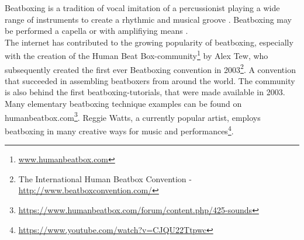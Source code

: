 Beatboxing is a tradition of vocal imitation of a percussionist playing a wide range of instruments to create a rhythmic and musical groove \citep{Stowell2008}. 
Beatboxing may be performed a capella or with amplifiying means \citep{Stowell2008}. \\The internet has contributed to the growing popularity of beatboxing, especially with the creation of the Human Beat Box-community\footnote{\url{www.humanbeatbox.com}} by Alex Tew, who subsequently created the first ever Beatboxing convention in 2003\footnote{The International Human Beatbox Convention - \url{http://www.beatboxconvention.com/}}. A convention that succeeded in assembling beatboxers from around the world. The community is also behind the first beatboxing-tutorials, that were made available in 2003. Many elementary beatboxing technique examples can be found on humanbeatbox.com\footnote{\url{https://www.humanbeatbox.com/forum/content.php/425-sounds}}. Reggie Watts, a currently popular artist, employs beatboxing in many creative ways for music and performances\footnote{\url{https://www.youtube.com/watch?v=CJQU22Ttpwc}}.

